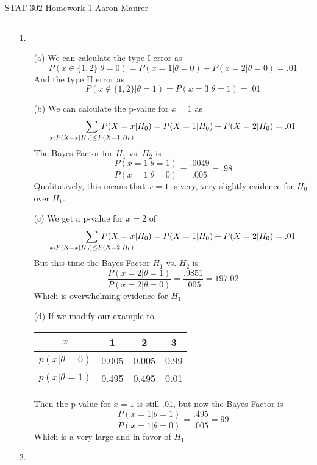 \documentclass[11pt]{article}
\theoremstyle{definition}
\begin{document}
STAT 302 Homework 1 \hfill Aaron Maurer
\vspace{2mm}
\hrule
\vspace{2mm}

\begin{itemize}
    \item[1.]
        \begin{itemize}
            \item[(a)]
                We can calculate the type I error as
                \[P(x\in\{1,2\}|\theta=0) = P(x=1|\theta=0) + P(x=2|\theta=0) = .01\]
                And the type II error as 
                \[P(x\not\in\{1,2\}|\theta=1) = P(x=3|\theta=1) =.01\]
            \item[(b)]
                We can calculate the p-value for $x=1$ as 
                \[ \sum_{x: P(X=x|H_0)\leq P(X=1|H_0)} \hspace{-4em} P(X=x|H_0) = P(X=1|H_0) + P(X=2|H_0) = .01\]
                The Bayes Factor for $H_1$ vs. $H_2$ is
                \[\frac{P(x=1|\theta=1)}{P(x=1|\theta=0)} =\frac{.0049}{.005} = .98\]
                Qualitatively, this means that $x=1$ is very, very slightly evidence for $H_0$ over $H_1$.
            \item[(c)]
                We get a p-value for $x=2$ of 
                \[ \sum_{x: P(X=x|H_0)\leq P(X=2|H_0)} \hspace{-4em} P(X=x|H_0) = P(X=1|H_0) + P(X=2|H_0) = .01\]
                But this time the Bayes Factor $H_1$ vs. $H_2$ is
                \[\frac{P(x=2|\theta=1)}{P(x=2|\theta=0)} =\frac{.9851}{.005} = 197.02\]
                Which is overwhelming evidence for $H_1$
            \item[(d)]
                If we modify our example to \\
                \begin{table}[h!]
                \center
                \begin{tabular}{c|c|c|c}
                $x$ & 1 & 2 & 3 \\ \hline
                $p(x|\theta=0)$ & 0.005 & 0.005 & 0.99 \\
                $p(x|\theta=1)$ & 0.495 & 0.495 & 0.01 
                \end{tabular}
                \end{table}

                Then the p-value for $x=1$ is still .01, but now the Bayes Factor is
                \[\frac{P(x=1|\theta=1)}{P(x=1|\theta=0)} =\frac{.495}{.005} = 99\]
                Which is a very large and in favor of $H_1$
        \end{itemize}
    \item[2.]


\end{itemize}
\end{document}
